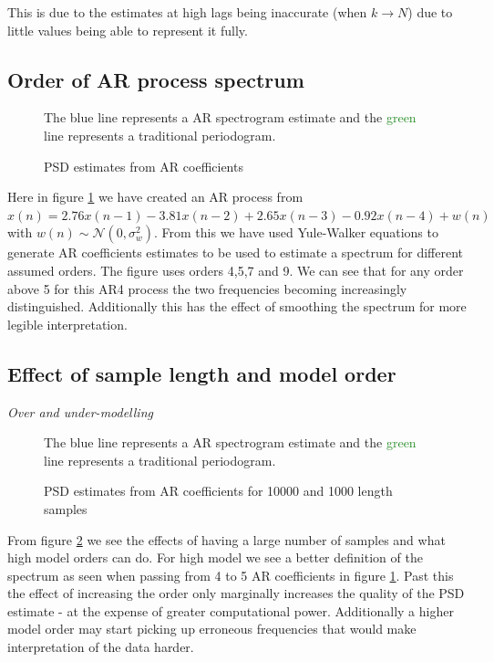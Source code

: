 \documentclass[10pt,twoside,a4paper]{report}
\begin{document}
This is due to the estimates at high lags being inaccurate (when $k\to N$) due to little values being able to represent it fully.

\subsection{Order of AR process spectrum}

 \begin{figure}[h!]
 \centering
 \resizebox{\textwidth}{!}{}
 The \textcolor{NavyBlue}{blue} line represents a AR spectrogram estimate and the \textcolor{ForestGreen}{green} line represents a traditional periodogram.
 \caption{PSD estimates from AR coefficients}
 \label{fig:2_3b}
 \end{figure}

Here in figure \ref{fig:2_3b} we have created an AR process from $x(n) = 2.76 x(n-1) - 3.81 x(n-2) + 2.65 x(n-3) - 0.92 x(n-4) + w(n)$ with $w(n) \sim \mathcal{N}(0,\sigma_w^2)$. From this we have used Yule-Walker equations to generate AR coefficients estimates to be used to estimate a spectrum for different assumed orders. The figure uses orders 4,5,7 and 9. We can see that for any order above 5 for this AR4 process the two frequencies becoming increasingly distinguished. Additionally this has the effect of smoothing the spectrum for more legible interpretation.


\subsection{Effect of sample length and model order}
\textit{Over and under-modelling}
\begin{figure}[h!]
 \centering
 \resizebox{\textwidth}{!}{}
 The \textcolor{NavyBlue}{blue} line represents a AR spectrogram estimate and the \textcolor{ForestGreen}{green} line represents a traditional periodogram.
 \caption{PSD estimates from AR coefficients for 10000 and 1000 length samples}
 \label{fig:2_3c}
\end{figure}
 
From figure \ref{fig:2_3c} we see the effects of having a large number of samples and what high model orders can do. For high model we see a better definition of the spectrum as seen when passing from 4 to 5 AR coefficients in figure \ref{fig:2_3b}. Past this the effect of increasing the order only marginally increases the quality of the PSD estimate - at the expense of greater computational power. Additionally a higher model order may start picking up erroneous frequencies that would make interpretation of the data harder.
\end{document}
